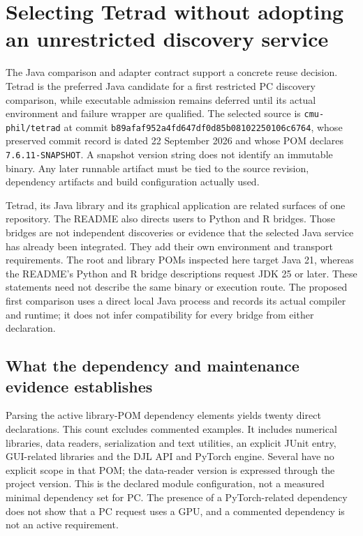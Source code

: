 \hypertarget{selecting-tetrad-without-adopting-an-unrestricted-discovery-service}{%
\section{Selecting Tetrad without adopting an unrestricted discovery
service}\label{selecting-tetrad-without-adopting-an-unrestricted-discovery-service}}

\label{exec13:tetrad-reuse}

The Java comparison and adapter contract support a concrete reuse
decision. Tetrad is the preferred Java candidate for a first restricted
PC discovery comparison, while executable admission remains deferred
until its actual environment and failure wrapper are qualified. The
selected source is \texttt{cmu-phil/tetrad} at commit
\texttt{b89afaf952a4fd647df0d85b08102250106c6764}, whose preserved
commit record is dated 22 September 2026 and whose POM declares
\texttt{7.6.11-SNAPSHOT}. A snapshot version string does not identify an
immutable binary. Any later runnable artifact must be tied to the source
revision, dependency artifacts and build configuration actually used.
\citep{exec13_tetrad_reuse_primary,exec13_tetrad_reuse_decision}

Tetrad, its Java library and its graphical application are related
surfaces of one repository. The README also directs users to Python and
R bridges. Those bridges are not independent discoveries or evidence
that the selected Java service has already been integrated. They add
their own environment and transport requirements. The root and library
POMs inspected here target Java 21, whereas the README's Python and R
bridge descriptions request JDK 25 or later. These statements need not
describe the same binary or execution route. The proposed first
comparison uses a direct local Java process and records its actual
compiler and runtime; it does not infer compatibility for every bridge
from either declaration. \citep{exec13_tetrad_reuse_primary}

\hypertarget{what-the-dependency-and-maintenance-evidence-establishes}{%
\subsection{What the dependency and maintenance evidence
establishes}\label{what-the-dependency-and-maintenance-evidence-establishes}}

Parsing the active library-POM dependency elements yields twenty direct
declarations. This count excludes commented examples. It includes
numerical libraries, data readers, serialization and text utilities, an
explicit JUnit entry, GUI-related libraries and the DJL API and PyTorch
engine. Several have no explicit scope in that POM; the data-reader
version is expressed through the project version. This is the declared
module configuration, not a measured minimal dependency set for PC. The
presence of a PyTorch-related dependency does not show that a PC request
uses a GPU, and a commented dependency is not an active requirement.
\citep{exec13_tetrad_reuse_primary}

